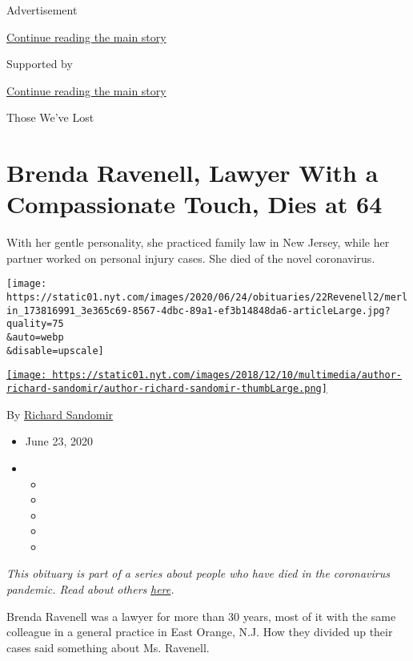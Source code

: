 Advertisement

\protect\hyperlink{after-top}{Continue reading the main story}

Supported by

\protect\hyperlink{after-sponsor}{Continue reading the main story}

Those We've Lost

\hypertarget{brenda-ravenell-lawyer-with-a-compassionate-touch-dies-at-64}{%
\section{Brenda Ravenell, Lawyer With a Compassionate Touch, Dies at
64}\label{brenda-ravenell-lawyer-with-a-compassionate-touch-dies-at-64}}

With her gentle personality, she practiced family law in New Jersey,
while her partner worked on personal injury cases. She died of the novel
coronavirus.

\texttt{[image: https://static01.nyt.com/images/2020/06/24/obituaries/22Revenell2/merlin\_173816991\_3e365c69-8567-4dbc-89a1-ef3b14848da6-articleLarge.jpg?quality=75\\\&auto=webp\\\&disable=upscale]}

\href{https://www.nytimes.com/by/richard-sandomir}{\texttt{[image: https://static01.nyt.com/images/2018/12/10/multimedia/author-richard-sandomir/author-richard-sandomir-thumbLarge.png]}}

By \href{https://www.nytimes.com/by/richard-sandomir}{Richard Sandomir}

\begin{itemize}
\item
  June 23, 2020
\item
  \begin{itemize}
  \item
  \item
  \item
  \item
  \item
  \end{itemize}
\end{itemize}

\emph{This obituary is part of a series about people who have died in
the coronavirus pandemic. Read about others}
\href{https://www.nytimes.com/interactive/2020/obituaries/people-died-coronavirus-obituaries.html}{\emph{here}}\emph{.}

Brenda Ravenell was a lawyer for more than 30 years, most of it with the
same colleague in a general practice in East Orange, N.J. How they
divided up their cases said something about Ms. Ravenell.

